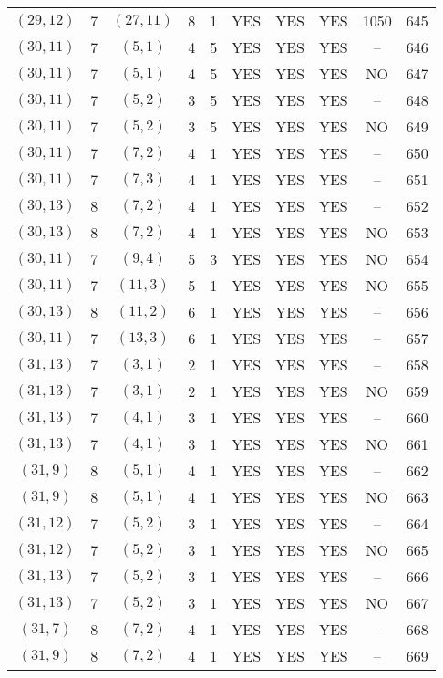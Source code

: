 \begin{longtable}{|c|c|c|c|c|c|c|c|c|c|}
$(29, 12)$ & 7 & $(27, 11)$ & 8 & 1 & YES & YES & YES & 1050 & 645\\
$(30, 11)$ & 7 & $(5, 1)$ & 4 & 5 & YES & YES & YES & -- & 646\\
$(30, 11)$ & 7 & $(5, 1)$ & 4 & 5 & YES & YES & YES & NO & 647\\
$(30, 11)$ & 7 & $(5, 2)$ & 3 & 5 & YES & YES & YES & -- & 648\\
$(30, 11)$ & 7 & $(5, 2)$ & 3 & 5 & YES & YES & YES & NO & 649\\
$(30, 11)$ & 7 & $(7, 2)$ & 4 & 1 & YES & YES & YES & -- & 650\\
$(30, 11)$ & 7 & $(7, 3)$ & 4 & 1 & YES & YES & YES & -- & 651\\
$(30, 13)$ & 8 & $(7, 2)$ & 4 & 1 & YES & YES & YES & -- & 652\\
$(30, 13)$ & 8 & $(7, 2)$ & 4 & 1 & YES & YES & YES & NO & 653\\
$(30, 11)$ & 7 & $(9, 4)$ & 5 & 3 & YES & YES & YES & NO & 654\\
$(30, 11)$ & 7 & $(11, 3)$ & 5 & 1 & YES & YES & YES & NO & 655\\
$(30, 13)$ & 8 & $(11, 2)$ & 6 & 1 & YES & YES & YES & -- & 656\\
$(30, 11)$ & 7 & $(13, 3)$ & 6 & 1 & YES & YES & YES & -- & 657\\
$(31, 13)$ & 7 & $(3, 1)$ & 2 & 1 & YES & YES & YES & -- & 658\\
$(31, 13)$ & 7 & $(3, 1)$ & 2 & 1 & YES & YES & YES & NO & 659\\
$(31, 13)$ & 7 & $(4, 1)$ & 3 & 1 & YES & YES & YES & -- & 660\\
$(31, 13)$ & 7 & $(4, 1)$ & 3 & 1 & YES & YES & YES & NO & 661\\
$(31, 9)$ & 8 & $(5, 1)$ & 4 & 1 & YES & YES & YES & -- & 662\\
$(31, 9)$ & 8 & $(5, 1)$ & 4 & 1 & YES & YES & YES & NO & 663\\
$(31, 12)$ & 7 & $(5, 2)$ & 3 & 1 & YES & YES & YES & -- & 664\\
$(31, 12)$ & 7 & $(5, 2)$ & 3 & 1 & YES & YES & YES & NO & 665\\
$(31, 13)$ & 7 & $(5, 2)$ & 3 & 1 & YES & YES & YES & -- & 666\\
$(31, 13)$ & 7 & $(5, 2)$ & 3 & 1 & YES & YES & YES & NO & 667\\
$(31, 7)$ & 8 & $(7, 2)$ & 4 & 1 & YES & YES & YES & -- & 668\\
$(31, 9)$ & 8 & $(7, 2)$ & 4 & 1 & YES & YES & YES & -- & 669\\

\end{longtable}
